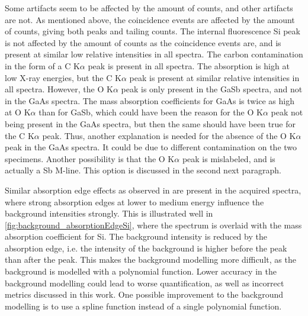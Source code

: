 Some artifacts seem to be affected by the amount of counts, and other artifacts are not.
As mentioned above, the coincidence events are affected by the amount of counts, giving both peaks and tailing counts.
The internal fluorescence Si peak is not affected by the amount of counts as the coincidence events are, and is present at similar low relative intensities in all spectra.
The carbon contamination in the form of a C K$\alpha$ peak is present in all spectra.
The absorption is high at low X-ray energies, but the C K$\alpha$ peak is present at similar relative intensities in all spectra.
However, the O K$\alpha$ peak is only present in the GaSb spectra, and not in the GaAs spectra.
The mass absorption coefficients for GaAs is twice as high at O K$\alpha$ than for GaSb, which could have been the reason for the O K$\alpha$ peak not being present in the GaAs spectra, but then the same should have been true for the C K$\alpha$ peak.
Thus, another explanation is needed for the absence of the O K$\alpha$ peak in the GaAs spectra.
It could be due to different contamination on the two specimens.
Another possibility is that the O K$\alpha$ peak is mislabeled, and is actually a Sb M-line.
This option is discussed in the second next paragraph.


Similar absorption edge effects as observed in \cite{project_report} are present in the acquired spectra, where strong absorption edges at lower to medium energy influence the background intensities strongly.
This is illustrated well in \cref{fig:background_absorptionEdgeSi}, where the spectrum is overlaid with the mass absorption coefficient for Si.
The background intensity is reduced by the absorption edge, i.e. the intensity of the background is higher before the peak than after the peak.
This makes the background modelling more difficult, as the background is modelled with a polynomial function.
Lower accuracy in the background modelling could lead to worse quantification, as well as incorrect metrics discussed in this work.
One possible improvement to the background modelling is to use a spline function instead of a single polynomial function.


